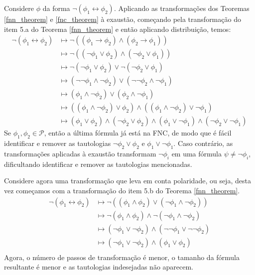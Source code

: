 \begin{example}
	\label{exemplo_fnn_fnc}
    Considere $\phi$ da forma $\neg(\phi_1 \leftrightarrow \phi_2)$. Aplicando as transformações dos Teoremas \ref{fnn_theorem} e \ref{fnc_theorem} à exaustão, começando pela transformação do item 5.a do Teorema \ref{fnn_theorem} e então aplicando distribuição, temos:
    \begin{equation*}
        \begin{split}
            \neg(\phi_1 \leftrightarrow \phi_2) & \longmapsto \neg((\phi_1 \rightarrow \phi_2) \wedge (\phi_2 \rightarrow \phi_1)) \\
                 & \longmapsto \neg((\neg \phi_1 \vee \phi_2) \wedge (\neg \phi_2 \vee \phi_1)) \\
                 & \longmapsto \neg(\neg \phi_1 \vee \phi_2) \vee \neg(\neg \phi_2 \vee \phi_1) \\
                 & \longmapsto (\neg \neg \phi_1 \wedge \neg \phi_2) \vee (\neg \neg \phi_2 \wedge \neg \phi_1) \\
                 & \longmapsto (\phi_1 \wedge \neg \phi_2) \vee (\phi_2 \wedge \neg \phi_1) \\
                 & \longmapsto ((\phi_1 \wedge \neg \phi_2) \vee \phi_2) \wedge ((\phi_1 \wedge \neg \phi_2) \vee \neg \phi_1) \\
                 & \longmapsto (\phi_1 \vee \phi_2) \wedge (\neg \phi_2 \vee \phi_2) \wedge (\phi_1 \vee \neg \phi_1) \wedge (\neg \phi_2 \vee \neg \phi_1)
        \end{split}
    \end{equation*}
    Se $\phi_1,\phi_2 \in \mathcal{P}$, então a última fórmula já está na FNC, de modo que é fácil identificar e remover as tautologias $\neg \phi_2 \vee \phi_2$ e $\phi_1 \vee \neg \phi_1$. Caso contrário, as transformações aplicadas à exaustão transformam $\neg \phi_i$ em uma fórmula $\psi \neq \neg \phi_i$, dificultando identificar e remover as tautologias mencionadas.
    
    Considere agora uma transformação que leva em conta polaridade, ou seja, desta vez começamos com a transformação do item 5.b do Teorema \ref{fnn_theorem}.
    \begin{equation*}
        \begin{split}
            \neg(\phi_1 \leftrightarrow \phi_2) & \longmapsto \neg((\phi_1 \wedge \phi_2) \vee (\neg \phi_1 \wedge \neg \phi_2)) \\
                 & \longmapsto \neg(\phi_1 \wedge \phi_2) \wedge \neg(\neg \phi_1 \wedge \neg \phi_2) \\
                 & \longmapsto (\neg \phi_1 \vee \neg \phi_2) \wedge (\neg \neg \phi_1 \vee \neg \neg \phi_2) \\
                 & \longmapsto (\neg \phi_1 \vee \neg \phi_2) \wedge (\phi_1 \vee \phi_2) \\
        \end{split}
    \end{equation*}
    Agora, o número de passos de transformação é menor, o tamanho da fórmula resultante é menor e as tautologias indesejadas não aparecem.
    

\end{example}
